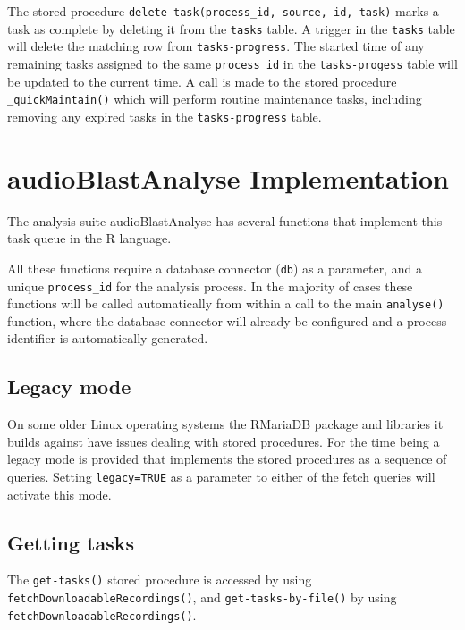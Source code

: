\documentclass[
]{book}
\begin{document}
The stored procedure \texttt{delete-task(process\_id,\ source,\ id,\ task)} marks a task as complete by deleting it from the \texttt{tasks} table. A trigger in the \texttt{tasks} table will delete the matching row from \texttt{tasks-progress}. The started time of any remaining tasks assigned to the same \texttt{process\_id} in the \texttt{tasks-progess} table will be updated to the current time. A call is made to the stored procedure \texttt{\_quickMaintain()} which will perform routine maintenance tasks, including removing any expired tasks in the \texttt{tasks-progress} table.

\hypertarget{audioblastanalyse-implementation}{%
\section{audioBlastAnalyse Implementation}\label{audioblastanalyse-implementation}}

The analysis suite audioBlastAnalyse has several functions that implement this task queue in the R language.

All these functions require a database connector (\texttt{db}) as a parameter, and a unique \texttt{process\_id} for the analysis process. In the majority of cases these functions will be called automatically from within a call to the main \texttt{analyse()} function, where the database connector will already be configured and a process identifier is automatically generated.

\hypertarget{legacy-mode}{%
\subsection{Legacy mode}\label{legacy-mode}}

On some older Linux operating systems the RMariaDB package and libraries it builds against have issues dealing with stored procedures. For the time being a legacy mode is provided that implements the stored procedures as a sequence of queries. Setting \texttt{legacy=TRUE} as a parameter to either of the fetch queries will activate this mode.

\hypertarget{getting-tasks}{%
\subsection{Getting tasks}\label{getting-tasks}}

The \texttt{get-tasks()} stored procedure is accessed by using \texttt{fetchDownloadableRecordings()}, and \texttt{get-tasks-by-file()} by using \texttt{fetchDownloadableRecordings()}.
\end{document}
